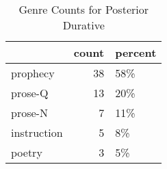 \begin{table}[htbp!]
\centering
\caption{Genre Counts for Posterior Durative}
\label{table:postdur_gen_cp,}
\begin{tabular}{lrl}
\toprule
{} &  count & percent \\
\midrule
prophecy    &     38 &     58\% \\
prose-Q     &     13 &     20\% \\
prose-N     &      7 &     11\% \\
instruction &      5 &      8\% \\
poetry      &      3 &      5\% \\
\bottomrule
\end{tabular}
\end{table}
